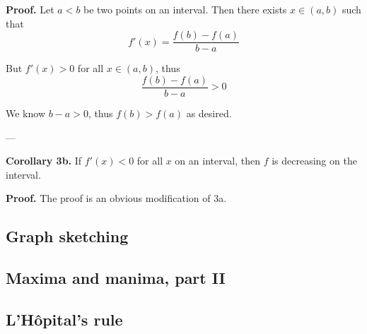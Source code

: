 \vs

\textbf{Proof.} Let $a<b$ be two points on an interval. Then there
exists $x\in(a,b)$ such that
\[f'(x)=\frac{f(b)-f(a)}{b-a}\]

But $f'(x)>0$ for all $x\in(a,b)$, thus
\[\frac{f(b)-f(a)}{b-a}>0\]

We know $b-a>0$, thus $f(b)>f(a)$ as desired.

\vs---\vs

\textbf{Corollary 3b.} If $f'(x)<0$ for all $x$ on an interval, then
$f$ is decreasing on the interval.

\vs

\textbf{Proof.} The proof is an obvious modification of 3a.

\subsection{Graph sketching}

\subsection{Maxima and manima, part II}

\subsection{L'H\^opital's rule}



